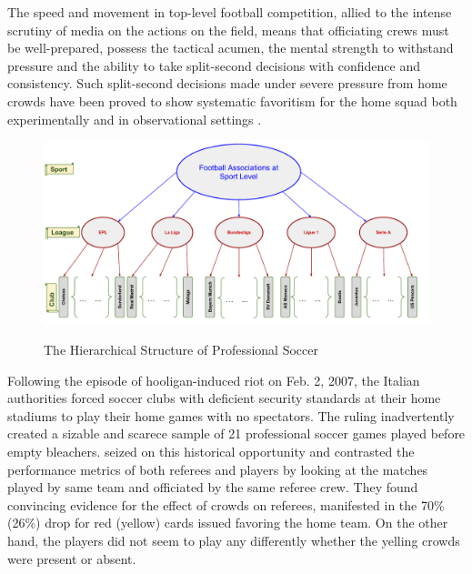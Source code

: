 \documentclass[USenglish]{article}
\begin{document}
The speed and movement in top-level football competition, allied to the intense scrutiny of media on the actions on the field, means that officiating crews must be well-prepared, possess the tactical acumen, the mental strength to withstand pressure and the ability to take split-second decisions with confidence and consistency. Such split-second decisions made under severe pressure from home crowds have been proved to show systematic favoritism for the home squad   
both experimentally \citep{Nevill1999, Nevill2002} and in observational settings \citep{Nevill1996, DOHMEN2008}.
\begin{figure}
\caption{The Hierarchical Structure of Professional Soccer }
{\includegraphics[width=1.0\linewidth]{HFA_22}}
\label{fig21}
\end{figure} 

Following the episode of hooligan-induced riot on Feb. 2, 2007, the Italian authorities forced soccer clubs with deficient security standards at their home stadiums to play their home games with no spectators. The ruling inadvertently created a sizable and scarece sample of 21 professional soccer games played before empty bleachers. \cite{Pettersson-Lidbom2010} seized on this historical opportunity and contrasted the performance metrics of both referees and players by looking at the matches played by same team and officiated by the same referee crew. They found convincing evidence for the effect of crowds on referees, manifested in the 70\% (26\%) drop for red (yellow) cards issued favoring the home team. On the other hand, the players did not seem to play any differently whether the yelling crowds were present or absent. 
\end{document}
